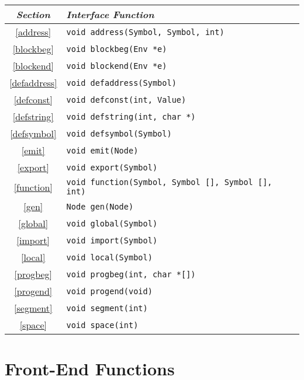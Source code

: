 \begin{center}
\begin{tabular}{cl}
\em Section	& \em Interface Function \\ \hline
\ref{address}	& \tt void address(Symbol, Symbol, int) \\
\ref{blockbeg}	& \tt void blockbeg(Env *e) \\
\ref{blockend}	& \tt void blockend(Env *e) \\
\ref{defaddress}& \tt void defaddress(Symbol) \\
\ref{defconst}	& \tt void defconst(int, Value) \\
\ref{defstring}	& \tt void defstring(int, char *) \\
\ref{defsymbol}	& \tt void defsymbol(Symbol) \\
\ref{emit}	& \tt void emit(Node) \\
\ref{export}	& \tt void export(Symbol) \\
\ref{function}	& \tt void function(Symbol, Symbol [], Symbol [], int) \\
\ref{gen}	& \tt Node gen(Node) \\
\ref{global}	& \tt void global(Symbol) \\
\ref{import}	& \tt void import(Symbol) \\
\ref{local}	& \tt void local(Symbol) \\
\ref{progbeg}	& \tt void progbeg(int, char *[]) \\
\ref{progend}	& \tt void progend(void) \\
\ref{segment}	& \tt void segment(int) \\
\ref{space}	& \tt void space(int) \\
\end{tabular}
\end{center}


\section{Front-End Functions}

\label{appendix:functions}

